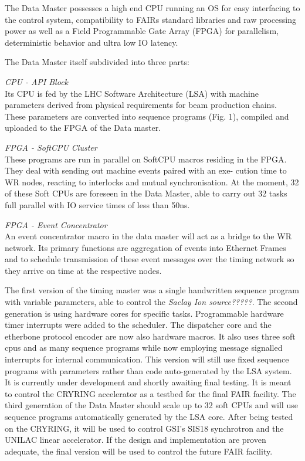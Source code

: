 The Data Master possesses a high end CPU running an
OS for easy interfacing to the control system, compatibility to 
FAIRs standard libraries and raw processing power as well as a 
Field Programmable Gate Array (FPGA) for parallelism, deterministic 
behavior and ultra low IO latency.

The Data Master itself subdivided into three parts:

\textit{CPU - API Block} \\
Its CPU is fed by the LHC Software
Architecture (LSA) with machine parameters derived from
physical requirements for beam production chains. These
parameters are converted into sequence programs (Fig. 1),
compiled and uploaded to the FPGA of the Data master.

\textit{FPGA - SoftCPU Cluster} \\
These programs are run in
parallel on SoftCPU macros residing in the FPGA. They
deal with sending out machine events paired with an exe-
cution time to WR nodes, reacting to interlocks and mutual
synchronisation. At the moment, 32 of these Soft CPUs are
foreseen in the Data Master, able to carry out 32 tasks full
parallel with IO service times of less than 50ns.

\textit{FPGA - Event Concentrator} \\
An event concentrator macro in the data master will act as a bridge to the WR
network. Its primary functions are aggregation of events
into Ethernet Frames and to schedule transmission of these
event messages over the timing network so they arrive on
time at the respective nodes.

The first version of the timing master was a single handwritten sequence program
with variable parameters, able to control the \textit{Saclay Ion source?????}.
The second generation is using hardware cores for specific tasks.
Programmable hardware timer interrupts were added to the scheduler.
The dispatcher core and the etherbone protocol encoder are now also hardware
macros. It also uses three soft cpus and as many sequence programs while now
employing message signalled interrupts for internal communication.
This version will still use fixed sequence programs with parameters rather
than code auto-generated by the LSA system. It is currently under development and
shortly awaiting final testing. It is meant to control the CRYRING accelerator
as a testbed for the final FAIR facility. The third generation of the Data Master should scale up to 32 soft CPUs and
will use sequence programs automatically generated by the LSA core. After being
tested on the CRYRING, it will be used to control GSI's SIS18 synchrotron and the UNILAC linear
accelerator. If the design and implementation are proven adequate, the final version will
be used to control the future FAIR facility.

